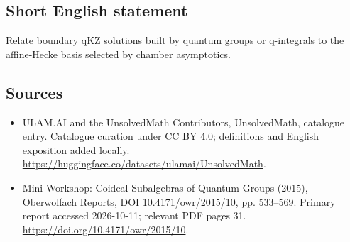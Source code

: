 \documentclass[11pt]{article}
\begin{document}
\subsection{Short English statement}
Relate boundary qKZ solutions built by quantum groups or q-integrals to the affine-Hecke basis selected by chamber asymptotics.
\subsection{Sources}
\begin{itemize}
\item[\hypertarget{source:statement:1}{S1}] ULAM.AI and the UnsolvedMath Contributors, UnsolvedMath, catalogue entry. Catalogue curation under CC BY 4.0; definitions and English exposition added locally.
\url{https://huggingface.co/datasets/ulamai/UnsolvedMath}.
\item[\hypertarget{source:statement:2}{S2}] Mini-Workshop: Coideal Subalgebras of Quantum Groups (2015), Oberwolfach Reports, DOI 10.4171/owr/2015/10, pp. 533--569. Primary report accessed 2026-10-11; relevant PDF pages 31.
\url{https://doi.org/10.4171/owr/2015/10}.
\end{itemize}
\label{end:statement}
\end{document}
